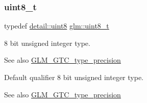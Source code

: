 \subsubsection{\texorpdfstring{uint8\+\_\+t}{uint8\_t}}
{\footnotesize\ttfamily typedef \hyperlink{namespaceglm_1_1detail_aef2588f97d090cc19fbbe0c74fe17c8f}{detail\+::uint8} \hyperlink{group__gtc__type__precision_ga93adf6dd9803408f3e3aaf9dedda352b}{glm\+::uint8\+\_\+t}}

8 bit unsigned integer type. \begin{DoxySeeAlso}{See also}
\hyperlink{group__gtc__type__precision}{G\+L\+M\+\_\+\+G\+T\+C\+\_\+type\+\_\+precision}
\end{DoxySeeAlso}
Default qualifier 8 bit unsigned integer type. \begin{DoxySeeAlso}{See also}
\hyperlink{group__gtc__type__precision}{G\+L\+M\+\_\+\+G\+T\+C\+\_\+type\+\_\+precision} 
\end{DoxySeeAlso}
